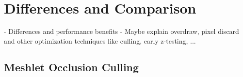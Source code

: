 



\section{Differences and Comparison} \label{sec-differences-and-comparison}

- Differences and performance benefits
- Maybe explain overdraw, pixel discard and other optimization techniques like culling, early z-testing, ...

\subsection{Meshlet Occlusion Culling} \label{subsec-meshlet-occ-culling}

